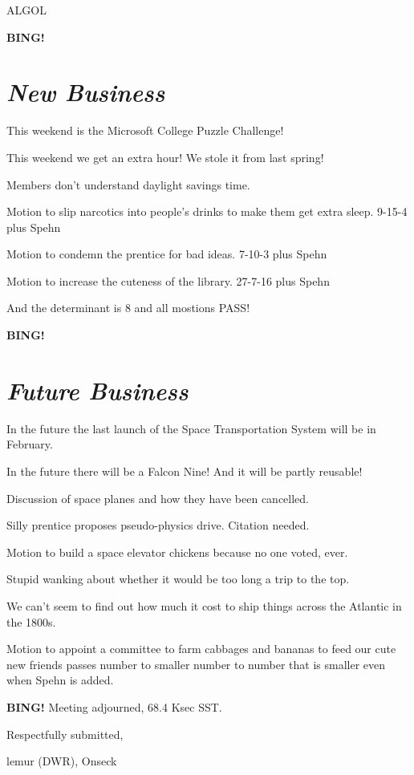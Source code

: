 \documentclass[10pt]{article}
\newcommand{\bing}{{\bf BING!} }
\newcommand{\goto}[1]{\bing \vskip 12pt \section*{{\em{#1}}}}
\newcommand{\ps}{ plus Spehn\xspace}
\newcommand{\onseck}{lemur (DWR), Onseck}
\begin{document}
ALGOL


\goto{New Business}

This weekend is the Microsoft College Puzzle Challenge!

This weekend we get an extra hour!  We stole it from last spring!

Members don't understand daylight savings time.

Motion to slip narcotics into people's drinks to make them
get extra sleep.
9-15-4\ps

Motion to condemn the prentice for bad ideas.
7-10-3\ps

Motion to increase the cuteness of the library.
27-7-16\ps

And the determinant is 8 and all mostions PASS!


\goto{Future Business}

In the future the last launch of the Space Transportation
System will be in February.

In the future there will be a Falcon Nine!  And it will be
partly reusable!

Discussion of space planes and how they have been cancelled.

Silly prentice proposes pseudo-physics drive.  Citation needed.

Motion to build a space elevator chickens because no one voted, ever.

Stupid wanking about whether it would be too long a trip to the top.

We can't seem to find out how much it cost to ship things across the
Atlantic in the 1800s.

Motion to appoint a committee to farm cabbages and bananas to feed
our cute new friends passes number to smaller number to number that
is smaller even when Spehn is added.

\bing
\noindent
Meeting adjourned, 68.4 Ksec SST.

\vspace{18pt}

\centerline{Respectfully submitted,}
\centerline{\onseck}
\end{document}
